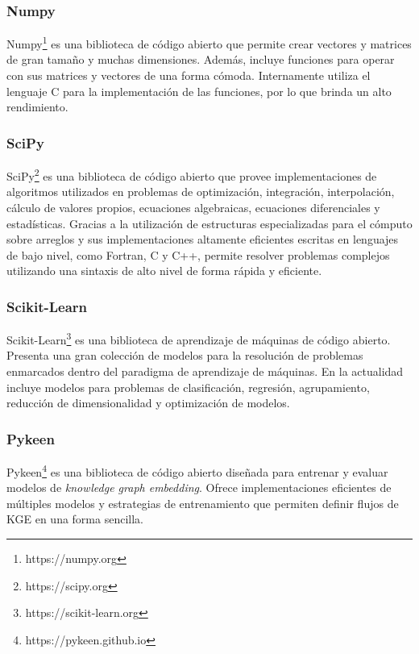 \subsubsection{Numpy}
Numpy\footnote[3]{https://numpy.org} es una biblioteca de c\'odigo abierto que permite crear vectores y matrices de gran
tama\~no y muchas dimensiones. Adem\'as, incluye
funciones para operar con sus matrices y vectores de una forma
c\'omoda. Internamente
utiliza el lenguaje C para la implementaci\'on de las funciones, por
lo que brinda un alto rendimiento.


\subsubsection{SciPy}
SciPy\footnote[4]{https://scipy.org} es una biblioteca de c\'odigo abierto que provee
implementaciones de algoritmos
utilizados en problemas de optimizaci\'on, integraci\'on, interpolaci\'on,
c\'alculo de valores propios, ecuaciones algebraicas, ecuaciones diferenciales y
estad\'isticas. Gracias a la utilizaci\'on de estructuras
especializadas para el c\'omputo sobre arreglos y sus implementaciones
altamente eficientes escritas en lenguajes de bajo nivel, como Fortran, C y C++,
permite resolver problemas complejos utilizando una sintaxis de alto nivel de forma r\'apida y eficiente.


\subsubsection{Scikit-Learn}
Scikit-Learn\footnote[5]{https://scikit-learn.org} es una biblioteca de aprendizaje de m\'aquinas de c\'odigo abierto.
Presenta una gran colecci\'on de modelos
para la resoluci\'on de problemas enmarcados dentro del paradigma de aprendizaje de m\'aquinas.
En la actualidad incluye modelos para problemas de clasificaci\'on, regresi\'on,
agrupamiento, reducci\'on de dimensionalidad y optimizaci\'on de modelos.

\subsubsection{Pykeen}

Pykeen\footnote[6]{https://pykeen.github.io} es una biblioteca de c\'odigo abierto dise\~nada para
entrenar y evaluar modelos de \textit{knowledge graph embedding}. Ofrece implementaciones eficientes
de m\'ultiples modelos y estrategias de entrenamiento que permiten
definir flujos de KGE en una forma sencilla.

